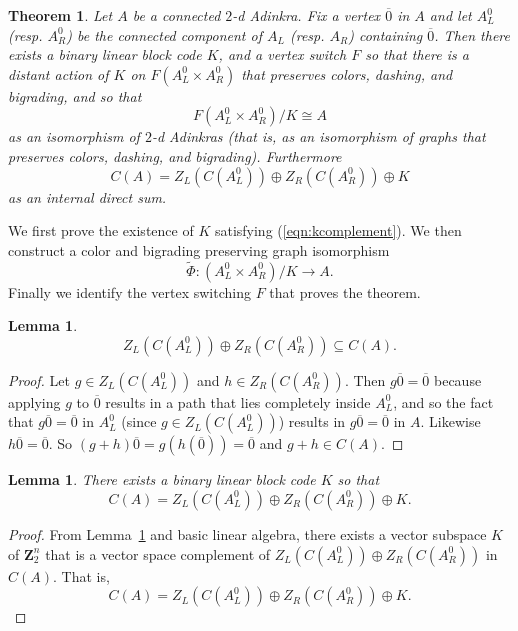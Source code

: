 \documentclass[12pt,twoside,singlespace]{article}
\numberwithin{equation}{section}
\newtheorem{thm}[equation]{Theorem}
\newtheorem{lem}[equation]{Lemma}
\theoremstyle{definition}
\newcommand{\ZZ}{\mathbf{Z}}
\begin{document}
\begin{thm}
\label{thm:quotient}
Let $A$ be a connected $2$-d Adinkra.  Fix a vertex $\overline{0}$ in $A$ and let $A_L^0$ (resp. $A_R^0$) be the connected component of $A_L$ (resp. $A_R$) containing $\overline{0}$. Then there exists a binary linear block code $K$, and a vertex switch $F$ so that there is a distant action of $K$ on $F(A_L^0\times A_R^0)$ that preserves colors, dashing, and bigrading, and so that
\[F(A_L^0\times A_R^0)/K\cong A\]
as an isomorphism of $2$-d Adinkras (that is, as an isomorphism of graphs that preserves colors, dashing, and bigrading).  Furthermore
\begin{equation}
\label{eqn:kcomplement}
C(A)=Z_L(C(A_L^0))\oplus Z_R(C(A_R^0))\oplus K
\end{equation}
as an internal direct sum.
\end{thm}


We first prove the existence of $K$ satisfying (\ref{eqn:kcomplement}).  We then construct a color and bigrading preserving graph isomorphism
\[\tilde{\Phi}:(A_L^0\times A_R^0)/K\to A.\]
Finally we identify the vertex switching $F$ that proves the theorem.


\begin{lem}
\label{lem:cplus}
\[Z_L(C(A_L^0))\oplus Z_R(C(A_R^0)) \subseteq C(A).\]
\end{lem}
\begin{proof}
Let $g\in Z_L(C(A_L^0))$ and $h\in Z_R(C(A_R^0))$.  Then $g\overline{0}=\overline{0}$ because applying $g$ to $\overline{0}$ results in a path that lies completely inside $A_L^0$, and so the fact that $g\overline{0}=\overline{0}$ in $A_L^0$ (since $g\in Z_L(C(A_L^0))$) results in $g\overline{0}=\overline{0}$ in $A$.  Likewise $h\overline{0}=\overline{0}$.  So $(g+h)\overline{0}=g(h(\overline{0}))=\overline{0}$ and $g+h\in C(A)$.
\end{proof}

\begin{lem}
\label{lem:existk}
There exists a binary linear block code $K$ so that
\[C(A)=Z_L(C(A_L^0))\oplus Z_R(C(A_R^0))\oplus K.
\]
\end{lem}
\begin{proof}
From Lemma~\ref{lem:cplus} and basic linear algebra, there exists a vector subspace $K$ of $\ZZ_2^n$ that is a vector space complement of
$Z_L(C(A_L^0))\oplus Z_R(C(A_R^0))$ in $C(A)$.  That is,
\[C(A)=Z_L(C(A_L^0))\oplus Z_R(C(A_R^0))\oplus K.\]
\end{proof}
\end{document}

